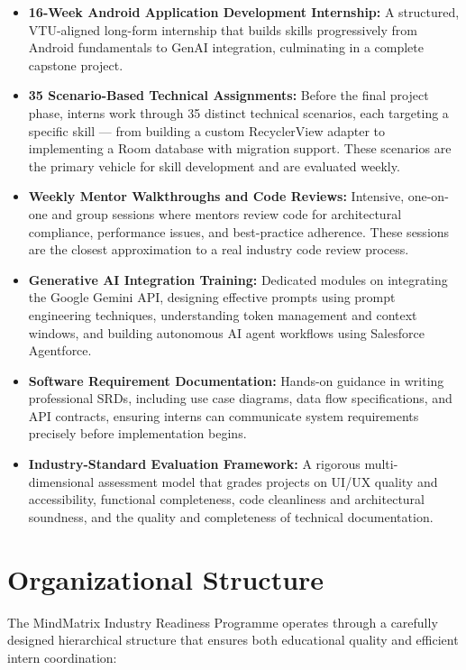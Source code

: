 \documentclass[12pt,a4paper]{report}
\begin{document}
\begin{itemize}
    \item \textbf{16-Week Android Application Development Internship:} A structured, VTU-aligned long-form internship that builds skills progressively from Android fundamentals to GenAI integration, culminating in a complete capstone project.
    \item \textbf{35 Scenario-Based Technical Assignments:} Before the final project phase, interns work through 35 distinct technical scenarios, each targeting a specific skill — from building a custom RecyclerView adapter to implementing a Room database with migration support. These scenarios are the primary vehicle for skill development and are evaluated weekly.
    \item \textbf{Weekly Mentor Walkthroughs and Code Reviews:} Intensive, one-on-one and group sessions where mentors review code for architectural compliance, performance issues, and best-practice adherence. These sessions are the closest approximation to a real industry code review process.
    \item \textbf{Generative AI Integration Training:} Dedicated modules on integrating the Google Gemini API, designing effective prompts using prompt engineering techniques, understanding token management and context windows, and building autonomous AI agent workflows using Salesforce Agentforce.
    \item \textbf{Software Requirement Documentation:} Hands-on guidance in writing professional SRDs, including use case diagrams, data flow specifications, and API contracts, ensuring interns can communicate system requirements precisely before implementation begins.
    \item \textbf{Industry-Standard Evaluation Framework:} A rigorous multi-dimensional assessment model that grades projects on UI/UX quality and accessibility, functional completeness, code cleanliness and architectural soundness, and the quality and completeness of technical documentation.
\end{itemize}

\section{Organizational Structure}

The MindMatrix Industry Readiness Programme operates through a carefully designed hierarchical structure that ensures both educational quality and efficient intern coordination:
\end{document}

